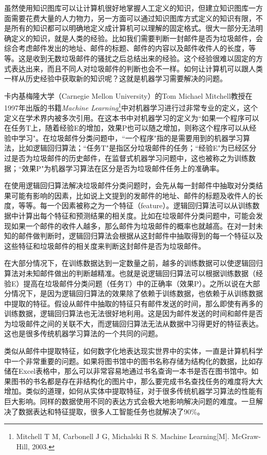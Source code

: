 \documentclass[10pt,a4paper]{ctexbook}
\begin{document}
虽然使用知识图库可以让计算机很好地掌握人工定义的知识，但建立知识图库一方面需要花费大量的人力物力，另一方面可以通过知识图库方式定义的知识有限，不是所有的知识都可以明确地定义成计算机可以理解的固定格式。很大一部分无法明确定义的知识，就是人类的经验。比如我们需要判断一封邮件是否为垃圾邮件，会综合考虑邮件发出的地址、邮件的标题、邮件的内容以及邮件收件人的长度，等等。这是收到无数垃圾邮件的骚扰之后总结出来的经验。这个经验很难以固定的方式表达出来，而且不同人对垃圾邮件的判断也会不一样。如何让计算机可以跟人类一样从历史经验中获取新的知识呢？这就是机器学习需要解决的问题。

卡内基梅隆大学（Carnegie Mellon University）的Tom Michael Mitchell教授在1997年出版的书籍\emph{Machine Learning}\footnote{Mitchell T M, Carbonell J G, Michalski R S. Machine Learning[M]. McGraw-Hill, 2003.}中对机器学习进行过非常专业的定义，这个定义在学术界内被多次引用。在这本书中对机器学习的定义为``如果一个程序可以在任务T上，随着经验E的增加，效果P也可以随之增加，则称这个程序可以从经验中学习"。在垃圾邮件分类问题中，``一个程序"指的是需要用到的机器学习算法，比如逻辑回归算法；``任务T"是指区分垃圾邮件的任务；``经验E"为已经区分过是否为垃圾邮件的历史邮件，在监督式机器学习问题中，这也被称之为训练数据；``效果P"为机器学习算法在区分是否为垃圾邮件任务上的准确率。

在使用逻辑回归算法解决垃圾邮件分类问题时，会先从每一封邮件中抽取对分类结果可能有影响的因素，比如说上文提到的发邮件的地址、邮件的标题及收件人的长度，等等。每一个因素被称之为一个特征（feature）。逻辑回归算法可以从训练数据中计算出每个特征和预测结果的相关度。比如在垃圾邮件分类问题中，可能会发现如果一个邮件的收件人越多，那么邮件为垃圾邮件的概率也就越高。在对一封未知的邮件做判断时，逻辑回归算法会根据从这封邮件中抽取得到的每一个特征以及这些特征和垃圾邮件的相关度来判断这封邮件是否为垃圾邮件。

在大部分情况下，在训练数据达到一定数量之前，越多的训练数据可以使逻辑回归算法对未知邮件做出的判断越精准。也就是说逻辑回归算法可以根据训练数据（经验E）提高在垃圾邮件分类问题（任务T）中的正确率（效果P）。之所以说在大部分情况下，是因为逻辑回归算法的效果除了依赖于训练数据，也依赖于从训练数据中提取的特征。假设从邮件中抽取的特征只有邮件发送的时间，那么即使有再多的训练数据，逻辑回归算法也无法很好地利用。这是因为邮件发送的时间和邮件是否为垃圾邮件之间的关联不大，而逻辑回归算法无法从数据中习得更好的特征表达。这也是很多传统机器学习算法的一个共同的问题。

类似从邮件中提取特征，如何数字化地表达现实世界中的实体，一直是计算机科学中一个非常重要的问题。如果将图书馆中的图书名称存储为结构化的数据，比如存储在Excel表格中，那么可以非常容易地通过书名查询一本书是否在图书馆中。如果图书的书名都是存在非结构化的图片中，那么要完成书名查找任务的难度将大大增加。类似的道理，如何从实体中提取特征，对于很多传统机器学习算法的性能有巨大影响。同样的数据使用不同的表达方式会极大地影响解决问题的难度。一旦解决了数据表达和特征提取，很多人工智能任务也就解决了90\%。
\end{document}
